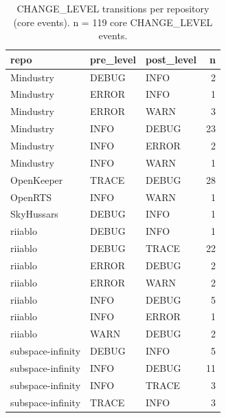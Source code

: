 \begin{table}[htbp]
\centering
\small
\caption{CHANGE\_LEVEL transitions per repository (core events). n = 119 core CHANGE\_LEVEL events.}
\label{tab:rq1_transitions_by_repo}
\begin{tabular}{lllr}
\toprule
repo & pre\_level & post\_level & n \\
\midrule
Mindustry & DEBUG & INFO & 2 \\
Mindustry & ERROR & INFO & 1 \\
Mindustry & ERROR & WARN & 3 \\
Mindustry & INFO & DEBUG & 23 \\
Mindustry & INFO & ERROR & 2 \\
Mindustry & INFO & WARN & 1 \\
OpenKeeper & TRACE & DEBUG & 28 \\
OpenRTS & INFO & WARN & 1 \\
SkyHussars & DEBUG & INFO & 1 \\
riiablo & DEBUG & INFO & 1 \\
riiablo & DEBUG & TRACE & 22 \\
riiablo & ERROR & DEBUG & 2 \\
riiablo & ERROR & WARN & 2 \\
riiablo & INFO & DEBUG & 5 \\
riiablo & INFO & ERROR & 1 \\
riiablo & WARN & DEBUG & 2 \\
subspace-infinity & DEBUG & INFO & 5 \\
subspace-infinity & INFO & DEBUG & 11 \\
subspace-infinity & INFO & TRACE & 3 \\
subspace-infinity & TRACE & INFO & 3 \\
\bottomrule
\end{tabular}
\end{table}
